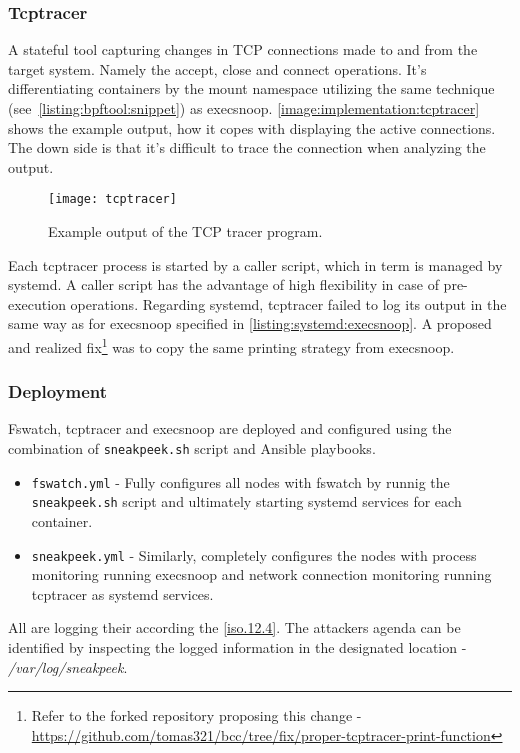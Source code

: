 \subsubsection*{Tcptracer \label{implementation:mon:hunting:tcptracer}}
A stateful tool capturing changes in TCP connections made to and from the target system. Namely the accept, close and connect operations. It's differentiating containers by the mount namespace utilizing the same technique (see~\autoref{listing:bpftool:snippet}) as execsnoop. \autoref{image:implementation:tcptracer} shows the example output, how it copes with displaying the active connections. The down side is that it's difficult to trace the connection when analyzing the output.

\begin{figure}[h]
	\centering
	\texttt{[image: tcptracer]}
	\caption{Example output of the TCP tracer program.}
	\label{image:implementation:tcptracer}
\end{figure}

Each tcptracer process is started by a caller script, which in term is managed by systemd. A caller script has the advantage of high flexibility in case of pre-execution operations. Regarding systemd, tcptracer failed to log its output in the same way as for execsnoop specified in \autoref{listing:systemd:execsnoop}. A proposed and realized fix\footnote{Refer to the forked repository proposing this change - \url{https://github.com/tomas321/bcc/tree/fix/proper-tcptracer-print-function}} was to copy the same printing strategy from execsnoop.

\subsubsection*{Deployment \label{implementation:mon:hunting:deploy}}
Fswatch, tcptracer and execsnoop are deployed and configured using the combination of \texttt{sneakpeek.sh} script and Ansible playbooks.
\begin{itemize}
	\item \texttt{fswatch.yml} - Fully configures all nodes with fswatch by runnig the \texttt{sneakpeek.sh} script and ultimately starting systemd services for each container.
	\item \texttt{sneakpeek.yml} - Similarly, completely configures the nodes with process monitoring running execsnoop and network connection monitoring running tcptracer as systemd services.
\end{itemize}
All are logging their according the \ref{iso.12.4}. The attackers agenda can be identified by inspecting the logged information in the designated location - \textit{/var/log/sneakpeek}.

